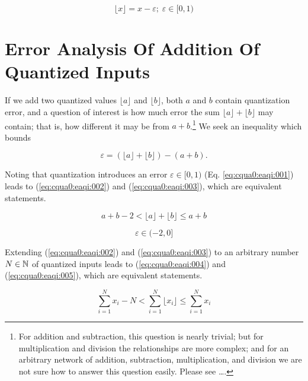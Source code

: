 \begin{equation}
\label{eq:cqua0:smoq:004}
\lfloor x \rfloor = x - \varepsilon{}; \; \varepsilon \in [0,1)
\end{equation}


\section{Error Analysis Of Addition Of Quantized Inputs}

If we add two quantized values $\lfloor a \rfloor$ and
$\lfloor b \rfloor$, both $a$ and $b$ contain quantization
error, and a question of interest is how much
error the sum $\lfloor a \rfloor + \lfloor b \rfloor$ may
contain; that is, how different it may be from $a+b$.\footnote{For
addition and subtraction, this question is nearly trivial; but for
multiplication and division the relationships are more complex; and for
an arbitrary network of addition, subtraction, multiplication, and
division we are not sure how to answer this question easily.
Please see \ldots{}.}
We seek an inequality which bounds

\begin{equation}
\label{eq:cqua0:eaqi:001}
\varepsilon{} = \left( {\lfloor a \rfloor + \lfloor b \rfloor} \right)
                      - \left( {a + b} \right)  .
\end{equation}

Noting that quantization introduces an error $\varepsilon \in [0,1)$
(Eq. \ref{eq:cqua0:eaqi:001}) leads to
(\ref{eq:cqua0:eaqi:002}) and (\ref{eq:cqua0:eaqi:003}), which are equivalent statements.

\begin{equation}
\label{eq:cqua0:eaqi:002}
a + b - 2 < \lfloor a \rfloor + \lfloor b \rfloor \leq a + b
\end{equation}

\begin{equation}
\label{eq:cqua0:eaqi:003}
\varepsilon \in (-2,0]
\end{equation}

Extending (\ref{eq:cqua0:eaqi:002}) and (\ref{eq:cqua0:eaqi:003})
to an arbitrary number $N \in {\mathbb{N}}{}$ of quantized inputs leads to
(\ref{eq:cqua0:eaqi:004}) and (\ref{eq:cqua0:eaqi:005}),
which are equivalent statements.

\begin{equation}
\label{eq:cqua0:eaqi:004}
\sum_{i=1}^{N} x_i - N < \sum_{i=1}^{N} \lfloor x_i \rfloor \leq \sum_{i=1}^{N} x_i
\end{equation}

